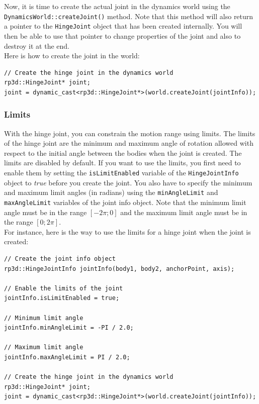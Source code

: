 \documentclass[a4paper,12pt]{article}
\begin{document}
    \vspace{0.6cm}

    Now, it is time to create the actual joint in the dynamics world using the \texttt{DynamicsWorld::createJoint()} method.
    Note that this method will also return a pointer to the \texttt{HingeJoint} object that has been created internally. You will then
    be able to use that pointer to change properties of the joint and also to destroy it at the end. \\

    Here is how to create the joint in the world: \\

    \begin{lstlisting}
// Create the hinge joint in the dynamics world
rp3d::HingeJoint* joint;
joint = dynamic_cast<rp3d::HingeJoint*>(world.createJoint(jointInfo));
  \end{lstlisting}

     \subsubsection{Limits}

     With the hinge joint, you can constrain the motion range using limits. The limits of the hinge joint are the minimum and maximum angle of rotation allowed with respect to the initial
     angle between the bodies when the joint is created. The limits are disabled by default. If you want to use the limits, you first need to enable them by setting the
     \texttt{isLimitEnabled} variable of the \texttt{HingeJointInfo} object to \emph{true} before you create the joint. You also have to specify the minimum and maximum limit
     angles (in radians) using the \texttt{minAngleLimit} and \texttt{maxAngleLimit} variables of the joint info object. Note that the minimum limit angle must be in the
     range $[ -2 \pi; 0 ]$ and the maximum limit angle must be in the range $[ 0; 2 \pi ]$. \\

     For instance, here is the way to use the limits for a hinge joint when the joint is created: \\

     \begin{lstlisting}
// Create the joint info object
rp3d::HingeJointInfo jointInfo(body1, body2, anchorPoint, axis);

// Enable the limits of the joint
jointInfo.isLimitEnabled = true;

// Minimum limit angle
jointInfo.minAngleLimit = -PI / 2.0;

// Maximum limit angle
jointInfo.maxAngleLimit = PI / 2.0;

// Create the hinge joint in the dynamics world
rp3d::HingeJoint* joint;
joint = dynamic_cast<rp3d::HingeJoint*>(world.createJoint(jointInfo));
  \end{lstlisting}
\end{document}
